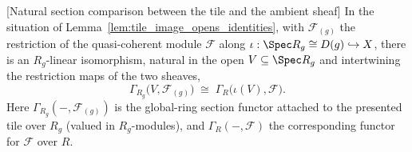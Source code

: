 \begin{lemma}
[Natural section comparison between the tile and the ambient sheaf]
  \label{lem:tile_section_comparison}
  In the situation of Lemma~\ref{lem:tile_image_opens_identities}, with
  \(\mathcal{F}_{(g)}\) the restriction of the quasi-coherent module
  \(\mathcal{F}\) along \(\iota : \Spec R_g \cong D(g) \hookrightarrow X\), there is an \(R_g\)-linear
  isomorphism, natural in the open \(V \subseteq \Spec R_g\) and intertwining the restriction maps of the
  two sheaves,
  \[
    \Gamma_{R_g}\bigl(V, \mathcal{F}_{(g)}\bigr) \;\cong\; \Gamma_R\bigl(\iota(V), \mathcal{F}\bigr).
  \]
  Here \(\Gamma_{R_g}(-, \mathcal{F}_{(g)})\) is the global-ring section functor attached to the
  presented tile over \(R_g\) (valued in \(R_g\)-modules), and \(\Gamma_R(-, \mathcal{F})\) the
  corresponding functor for \(\mathcal{F}\) over \(R\).
\end{lemma}
